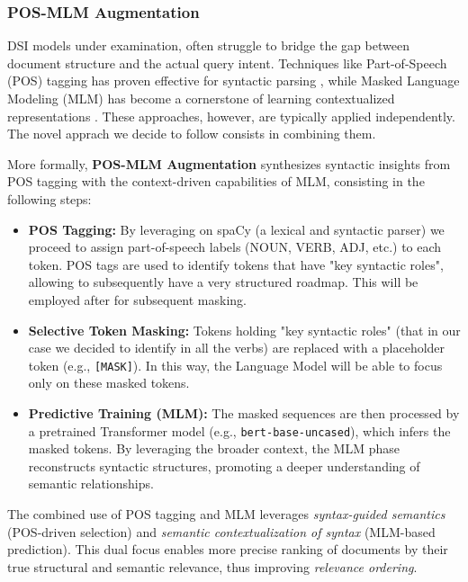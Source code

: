 \subsubsection{POS-MLM Augmentation}
DSI models under examination, often struggle to bridge the gap between document structure and the actual query intent. Techniques like Part-of-Speech (POS) tagging has proven effective for syntactic parsing \cite{toutanova2003feature}, while Masked Language Modeling (MLM) has become a cornerstone of learning contextualized representations \cite{devlin2018bert}. These approaches, however, are typically applied independently. The novel apprach we decide to follow consists in combining them.

More formally, \textbf{POS-MLM Augmentation} synthesizes syntactic insights from POS tagging with the context-driven capabilities of MLM, consisting in the following steps:

\begin{itemize}
    \item \textbf{POS Tagging:} By leveraging on spaCy (a lexical and syntactic parser) we proceed to assign part-of-speech labels (NOUN, VERB, ADJ, etc.) to each token.  POS tags are used to identify tokens that have  "key syntactic roles", allowing to subsequently have a very structured roadmap. This will be employed after for subsequent masking.
    \item \textbf{Selective Token Masking:} Tokens holding "key syntactic roles" (that in our case we decided to identify in all the verbs) are replaced with a placeholder token (e.g., \texttt{[MASK]}). In this way, the Language Model will be able to focus only on these masked tokens.
    \item \textbf{Predictive Training (MLM):} The masked sequences are then processed by a pretrained Transformer model (e.g., \texttt{bert-base-uncased}), which infers the masked tokens. By leveraging the broader context, the MLM phase reconstructs syntactic structures, promoting a deeper understanding of semantic relationships.
\end{itemize}

The combined use of POS tagging and MLM leverages \textit{syntax-guided semantics} (POS-driven selection) and \textit{semantic contextualization of syntax} (MLM-based prediction). This dual focus enables more precise ranking of documents by their true structural and semantic relevance, thus improving \textit{relevance ordering}.




























